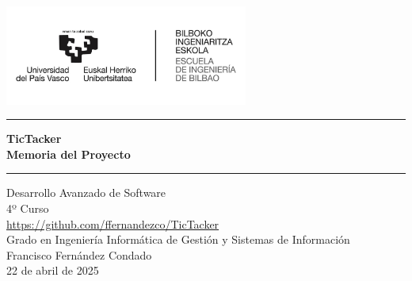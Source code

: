 \begin{titlepage}
\begin{center}
\vspace{2cm}
\includegraphics[width=0.6\textwidth]{root/bie.jpg}~\\[1cm]
\vspace{2cm}

\hrule
\vspace{.5cm}
{ \huge \bfseries TicTacker \\ \vspace{.5cm} Memoria del Proyecto}
\vspace{.5cm}

\hrule
\vspace{1.5cm}


\Large Desarrollo Avanzado de Software\\
\vspace{0.5cm}
\large 4º Curso\\
\vspace{1cm}
\url{https://github.com/ffernandezco/TicTacker}\\
\vspace{1cm}
\Large Grado en Ingeniería Informática de Gestión y Sistemas de Información\\
\vspace{1cm}
\large Francisco Fernández Condado\\
\vspace{0.5cm}
\large 22 de abril de 2025\\

\end{center}
\end{titlepage}